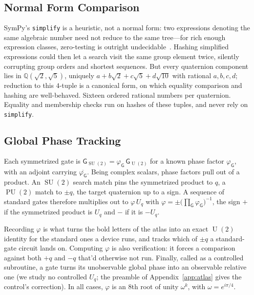 \documentclass[11pt, oneside, openany]{scrbook}
\DeclareMathOperator{\SU}{SU}
\DeclareMathOperator{\U}{U}
\DeclareMathOperator{\PU}{PU}
\begin{document}
\subsection{Normal Form Comparison}

SymPy's \texttt{simplify} is a heuristic, not a normal form: two expressions denoting the same algebraic number need not reduce to the same tree---for rich enough expression classes, zero-testing is outright undecidable~\cite{richardson1968undecidableproblemsinvolving}. Hashing simplified expressions could then let a search visit the same group element twice, silently corrupting group orders and shortest sequences. But every quaternion component lies in $\mathbb{Q}(\sqrt{2}, \sqrt{5})$, uniquely $a + b\sqrt{2} + c\sqrt{5} + d\sqrt{10}$ with rational $a, b, c, d$; reduction to this $4$-tuple is a canonical form, on which equality comparison and hashing are well-behaved. Sixteen ordered rational numbers per quaternion. Equality and membership checks run on hashes of these tuples, and never rely on \texttt{simplify}.

\subsection{Global Phase Tracking}

Each symmetrized gate is $\mathsf{G}_{\SU(2)} = \varphi_\mathsf{G} \, \mathsf{G}_{\U(2)}$ for a known phase factor $\varphi_\mathsf{G}$, with an adjoint carrying $\overline{\varphi_\mathsf{G}}$. Being complex scalars, phase factors pull out of a product. An $\SU(2)$ search match pins the symmetrized product to $q$, a $\PU(2)$ match to $\pm q$, the target quaternion up to a sign. A sequence of standard gates therefore multiplies out to $\varphi \, U_q$ with $\varphi = \pm \big(\prod_\mathsf{G} \varphi_\mathsf{G}\big)^{-1}$, the sign $+$ if the symmetrized product is $U_q$ and $-$ if it is $-U_q$.

Recording $\varphi$ is what turns the bold letters of the atlas into an exact $\U(2)$ identity for the standard ones a device runs, and tracks which of $\pm q$ a standard-gate circuit lands on. Computing $\varphi$ is also verification: it forces a comparison against both $+q$ and $-q$ that'd otherwise not run. Finally, called as a controlled subroutine, a gate turns its unobservable global phase into an observable relative one (we study no controlled $U_q$; the preamble of Appendix~\ref{app:atlas} gives the control's correction). In all cases, $\varphi$ is an 8th root of unity $\omega^k$, with $\omega = e^{i\pi/4}$.
\end{document}
